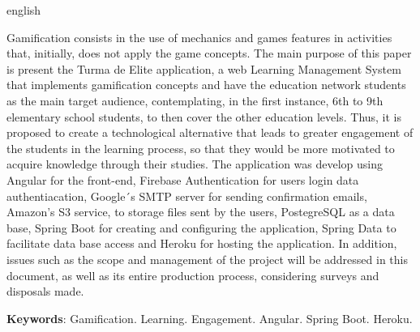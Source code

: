 \begin{resumo}[Abstract]
 \begin{otherlanguage*}{english}
 
    \vspace{\onelineskip}
 
     Gamification consists in the use of mechanics and games features in activities that, initially, does not apply the game concepts. The main purpose of this paper is present the Turma de Elite application, a web Learning Management System that implements gamification concepts and have the education network students as the main target audience, contemplating, in the first instance, 6th to 9th elementary school students, to then cover the other education levels.
     Thus, it is proposed to create a technological alternative that leads to greater engagement of the students in the learning process, so that they would be more motivated to acquire knowledge through their studies. The application was develop using Angular for the front-end, Firebase Authentication for users login data authentiacation, Google´s SMTP server for sending confirmation emails, Amazon's S3 service, to storage files sent by the users, PostegreSQL as a data base, Spring Boot for creating and configuring the application, Spring Data to facilitate data base access and Heroku for hosting the application. In addition, issues such as the scope and management of the project will be addressed in this document, as well as its entire production process, considering surveys and disposals made.
     
   \vspace{\onelineskip}
   \noindent 
   \textbf{Keywords}: Gamification. Learning. Engagement. Angular. Spring Boot. Heroku.
 \end{otherlanguage*}
\end{resumo}